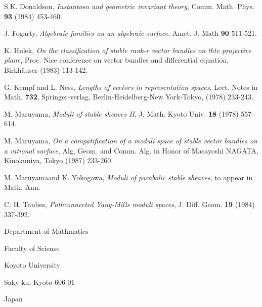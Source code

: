 \begin{thebibliography}{99}
 S.K. Donaldson, \textit{Instantosn and geometric invariant theory}, Comm. Math. Phys. {\bf 93} (1984) 453-460.

 J. Fogarty, \textit{Algebraic families on an algebraic surface}, Amet. J. Math {\bf 90} 511-521.

 K. Hulek, \textit{On the classification of stable rank-r vector bundles on thte projective plane}, Proc. Nice conference on vector bundles and differential equation, Birkh\"auser (1983) 113-142.

 G. Kempf and L. Ness, \textit{Lengths of vectors in  representation spaces}, Lect. Notes in Math.
{\bf 732}, Springer-verlag, Berlin-Heidelberg-New York-Tokyo, (1978) 233-243.

 M. Maruyama, \textit{Moduli of stable sheaves II}, J. Math. Kyoto Univ. {\bf 18}
(1978) 557-614.

 M. Maruyama, \textit{On a compatification of a moduli space of stable vector bundles on a rational surface}, Alg, Geom. and Comm. Alg. in Honor of Masayoshi NAGATA, Kinokuniya, Tokyo (1987) 233-260.

 M. Maruyama\pageoriginale and K. Yokogawa, \textit{Moduli of parabolic stable sheaves}, to appear in Math. Ann.

 C. H. Taubes, \textit{Pathconnected Yang-Mills moduli spaces}, J. Diff. Geom. {\bf 19} (1984) 337-392.
\end{thebibliography}

\bigskip

\begin{flushleft}
Department of Mathmatics

Faculty of Sciense

Koyoto University

Saky-ku, Kyoto 606-01

Japan
\end{flushleft}




